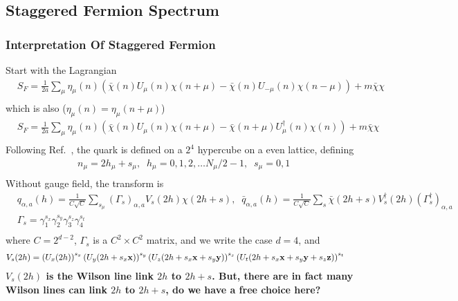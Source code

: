 \subsection{\label{StaggeredFermionSpectrum}Staggered Fermion Spectrum}

\subsubsection{\label{InterpretationOfStaggeredFermion}Interpretation Of Staggered Fermion}

Start with the Lagrangian
\begin{equation}
\begin{split}
&S_F=\frac{1}{2a}\sum _{\mu}\eta _{\mu}(n)\left(\bar{\chi} (n)U_{\mu}(n) \chi(n+\mu) - \bar{\chi}(n) U_{-\mu}(n)\chi(n-\mu)\right)+m\bar{\chi}\chi\\
\end{split}
\end{equation}
which is also ($\eta _{\mu}(n)=\eta _{\mu}(n+\mu)$)
\begin{equation}
\begin{split}
&S_F=\frac{1}{2a}\sum _{\mu}\eta _{\mu}(n)\left(\bar{\chi} (n)U_{\mu}(n) \chi(n+\mu) - \bar{\chi}(n+\mu) U_{\mu}^{\dagger}(n)\chi(n)\right)+m\bar{\chi}\chi\\
\end{split}
\end{equation}
Following Ref.~\cite{staggeredQuarks}, the quark is defined on a $2^4$ hypercube on a even lattice, defining
\begin{equation}
\begin{split}
&n_{\mu}=2h_{\mu}+s_{\mu},\;\;h_{\mu}=0,1,2,\ldots N_{\mu}/2-1,\;\;s_{\mu}=0,1\\
\end{split}
\end{equation}
Without gauge field, the transform is
\begin{equation}
\begin{split}
&q_{\alpha,a}(h)=\frac{1}{C\sqrt{C}}\sum _{s_{\mu}} (\Gamma _{s})_{\alpha,a}V_{s}(2h)\chi (2h+s),\;\;\bar{q}_{\alpha,a}(h)=\frac{1}{C\sqrt{C}}\sum _{s} \bar{\chi} (2h+s)V^{\dagger}_{s}(2h)(\Gamma _{s}^{\dagger})_{\alpha,a}\\
&\Gamma _{s}=\gamma _1^{s_x}\gamma _2^{s_y}\gamma _3^{s_z}\gamma _4^{s_t}\\
\end{split}
\end{equation}
where $C=2^{d-2}$, $\Gamma _{s}$ is a $C^2 \times C^2$ matrix, and we write the case $d=4$, and
\begin{equation}
\begin{split}
&V_{s}(2h)=\left(U_{x}(2h)\right)^{s_x}\left(U_{y}(2h+s_x{\bf x})\right)^{s_y}\left(U_{z}(2h +s_x{\bf x}+s_y{\bf y})\right)^{s_z}\left(U_{t}(2h+s_x{\bf x}+s_y{\bf y}+s_z{\bf z})\right)^{s_t}
\end{split}
\end{equation}
\textbf{$V_s(2h)$ is the Wilson line link $2h$ to $2h+s$. But, there are in fact many Wilson lines can link $2h$ to $2h+s$, do we have a free choice here?}

